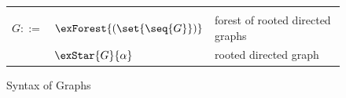 \begin{figure}[h]
   {\small
   \begin{minipage}[t]{0.48\textwidth}
      \begin{tabularx}{\textwidth}{rL{2.8cm}L{3cm}}
         &&
         \\
         $G ::=$
         &
         $\exForest{(\set{\seq{G}})}$
         &
         forest of rooted directed graphs
         \\
         &
         $\exStar{G}{\alpha}$
         &
         rooted directed graph
         \\
      \end{tabularx}
   \end{minipage}
   }
   \caption{Syntax of Graphs}
   \label{fig:graph-syntax}
\end{figure}